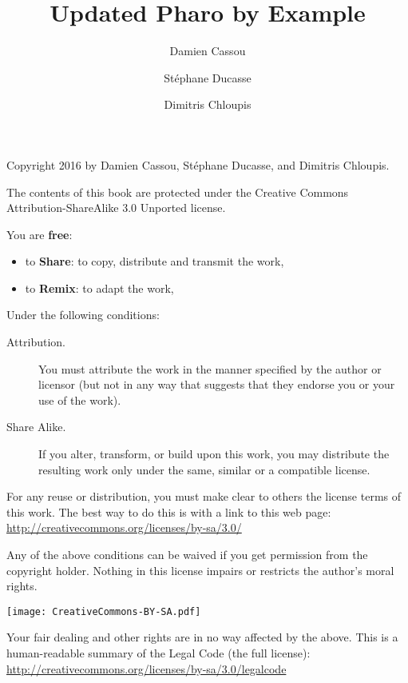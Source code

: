 \documentclass[10pt,twoside,english,showtrims]{support/latex/sbabook/sbabook}
\title{Updated Pharo by Example}
\author{
    Damien Cassou \and
    Stéphane Ducasse \and
    Dimitris Chloupis}
\date{\gitdate\titlebreak[\smallskip]{ -- }\protect\gitCommitInfo}
\begin{document}
\maketitle
\pagestyle{titlingpage}
\thispagestyle{titlingpage} %

\cleartoverso
{\small

  Copyright 2016 by Damien Cassou, Stéphane Ducasse, and Dimitris Chloupis.

  The contents of this book are protected under the Creative Commons
  Attribution-ShareAlike 3.0 Unported license.

  You are \textbf{free}:
  \begin{itemize}
  \item to \textbf{Share}: to copy, distribute and transmit the work,
  \item to \textbf{Remix}: to adapt the work,
  \end{itemize}

  Under the following conditions:
  \begin{description}
  \item[Attribution.] You must attribute the work in the manner specified by the
    author or licensor (but not in any way that suggests that they endorse you
    or your use of the work).
  \item[Share Alike.] If you alter, transform, or build upon this work, you may
    distribute the resulting work only under the same, similar or a compatible
    license.
  \end{description}

  For any reuse or distribution, you must make clear to others the
  license terms of this work. The best way to do this is with a link to
  this web page: \\
  \url{http://creativecommons.org/licenses/by-sa/3.0/}

  Any of the above conditions can be waived if you get permission from
  the copyright holder. Nothing in this license impairs or restricts the
  author's moral rights.

  \begin{center}
    \texttt{[image: CreativeCommons-BY-SA.pdf]}
  \end{center}

  Your fair dealing and other rights are in no way affected by the
  above. This is a human-readable summary of the Legal Code (the full
  license): \\
  \url{http://creativecommons.org/licenses/by-sa/3.0/legalcode}

}
\end{document}
